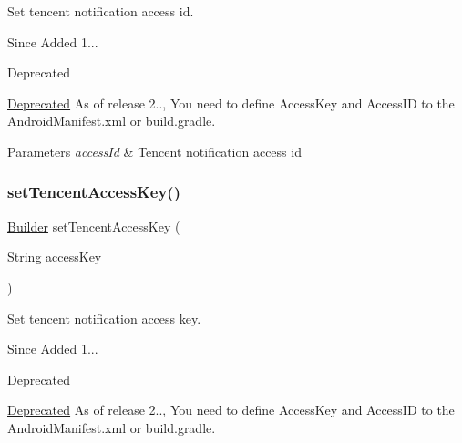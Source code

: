 Set tencent notification access id. 

\begin{DoxySince}{Since}
Added 1... 
\end{DoxySince}
\begin{DoxyRefDesc}{Deprecated}
\item[\hyperlink{deprecated__deprecated000015}{Deprecated}]As of release 2.., You need to define Access\+Key and Access\+ID to the Android\+Manifest.\+xml or build.\+gradle. \end{DoxyRefDesc}

\begin{DoxyParams}{Parameters}
{\em access\+Id} & Tencent notification access id \\
\hline
\end{DoxyParams}
\mbox{\label{classcom_1_1toast_1_1android_1_1gamebase_1_1_gamebase_configuration_1_1_builder_ac172551b643355d3ff300fca51c4bd50}} 
\subsubsection{\texorpdfstring{set\+Tencent\+Access\+Key()}{setTencentAccessKey()}}
{\footnotesize\ttfamily \hyperlink{classcom_1_1toast_1_1android_1_1gamebase_1_1_gamebase_configuration_1_1_builder}{Builder} set\+Tencent\+Access\+Key (\begin{DoxyParamCaption}\item[{String}]{access\+Key }\end{DoxyParamCaption})}



Set tencent notification access key. 

\begin{DoxySince}{Since}
Added 1... 
\end{DoxySince}
\begin{DoxyRefDesc}{Deprecated}
\item[\hyperlink{deprecated__deprecated000014}{Deprecated}]As of release 2.., You need to define Access\+Key and Access\+ID to the Android\+Manifest.\+xml or build.\+gradle. \end{DoxyRefDesc}

